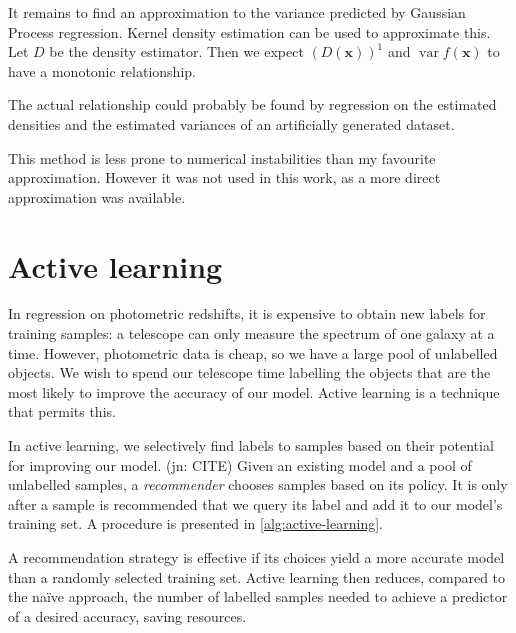 \documentclass[11pt,twoside,openright]{report}
\newcommand\bx{\mathbf{x}}
\DeclareMathOperator{\var}{var}
\newcommand\jn[1]{{\color{red}(jn: #1)}}
\begin{document}
It remains to find an approximation to the variance predicted by Gaussian Process regression. Kernel density estimation can be used to approximate this. Let $D$ be the density estimator. Then we expect $\left(D(\bx)\right)^1$ and $\var f(\bx)$ to have a monotonic relationship.

The actual relationship could probably be found by regression on the estimated densities and the estimated variances of an artificially generated dataset.

This method is less prone to numerical instabilities than my favourite approximation. However it was not used in this work, as a more direct approximation was available.


\chapter{Active learning}

In regression on photometric redshifts, it is expensive to obtain new labels for training samples: a telescope can only measure the spectrum of one galaxy at a time. However, photometric data is cheap, so we have a large pool of unlabelled objects. We wish to spend our telescope time labelling the objects that are the most likely to improve the accuracy of our model. Active learning is a technique that permits this.

In active learning, we selectively find labels to samples based on their potential for improving our model. \jn{CITE} Given an existing model and a pool of unlabelled samples, a \textit{recommender} chooses samples based on its policy. It is only after a sample is recommended that we query its label and add it to our model's training set. A procedure is presented in \cref{alg:active-learning}.

A recommendation strategy is effective if its choices yield a more accurate model than a randomly selected training set. Active learning then reduces, compared to the naïve approach, the number of labelled samples needed to achieve a predictor of a desired accuracy, saving resources.
\end{document}

